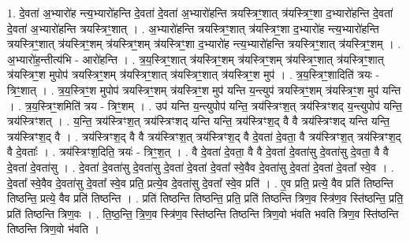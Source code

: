 \documentclass[17pt]{extarticle}
\begin{document}
1. दे॒वता॑ अ॒भ्यारो॑ह न्त्य॒भ्यारो॑हन्ति दे॒वता॑ दे॒वता॑ अ॒भ्यारो॑हन्ति त्रयस्त्रिꣳ॒॒शात् त्र॑यस्त्रिꣳ॒॒शा द॒भ्यारो॑हन्ति दे॒वता॑ दे॒वता॑ अ॒भ्यारो॑हन्ति त्रयस्त्रिꣳ॒॒शात् । . अ॒भ्यारो॑हन्ति त्रयस्त्रिꣳ॒॒शात् त्र॑यस्त्रिꣳ॒॒शा द॒भ्यारो॑ह न्त्य॒भ्यारो॑हन्ति त्रयस्त्रिꣳ॒॒शात् त्र॑यस्त्रिꣳ॒॒शम् त्र॑यस्त्रिꣳ॒॒शम् त्र॑यस्त्रिꣳ॒॒शा द॒भ्यारो॑ह न्त्य॒भ्यारो॑हन्ति त्रयस्त्रिꣳ॒॒शात् त्र॑यस्त्रिꣳ॒॒शम् । . अ॒भ्यारो॑ह॒न्तीत्य॑भि - आरो॑हन्ति । . त्र॒य॒स्त्रिꣳ॒॒शात् त्र॑यस्त्रिꣳ॒॒शम् त्र॑यस्त्रिꣳ॒॒शम् त्र॑यस्त्रिꣳ॒॒शात् त्र॑यस्त्रिꣳ॒॒शात् त्र॑यस्त्रिꣳ॒॒श मुपोप॑ त्रयस्त्रिꣳ॒॒शम् त्र॑यस्त्रिꣳ॒॒शात् त्र॑यस्त्रिꣳ॒॒शात् त्र॑यस्त्रिꣳ॒॒श मुप॑ । . त्र॒य॒स्त्रिꣳ॒॒शादिति॑ त्रयः - त्रिꣳ॒॒शात् । . त्र॒य॒स्त्रिꣳ॒॒श मुपोप॑ त्रयस्त्रिꣳ॒॒शम् त्र॑यस्त्रिꣳ॒॒श मुप॑ यन्ति य॒न्त्युप॑ त्रयस्त्रिꣳ॒॒शम् त्र॑यस्त्रिꣳ॒॒श मुप॑ यन्ति । . त्र॒य॒स्त्रिꣳ॒॒शमिति॑ त्रय - त्रिꣳ॒॒शम् । . उप॑ यन्ति य॒न्त्युपोप॑ यन्ति॒ त्रय॑स्त्रिꣳश॒त् त्रय॑स्त्रिꣳशद् य॒न्त्युपोप॑ यन्ति॒ त्रय॑स्त्रिꣳशत् । . य॒न्ति॒ त्रय॑स्त्रिꣳश॒त् त्रय॑स्त्रिꣳशद् यन्ति यन्ति॒ त्रय॑स्त्रिꣳश॒द् वै वै त्रय॑स्त्रिꣳशद् यन्ति यन्ति॒ त्रय॑स्त्रिꣳश॒द् वै । . त्रय॑स्त्रिꣳश॒द् वै वै त्रय॑स्त्रिꣳश॒त् त्रय॑स्त्रिꣳश॒द् वै दे॒वता॑ दे॒वता॒ वै त्रय॑स्त्रिꣳश॒त् त्रय॑स्त्रिꣳश॒द् वै दे॒वताः᳚ । . त्रय॑स्त्रिꣳश॒दिति॒ त्रयः॑ - त्रिꣳ॒॒श॒त् । . वै दे॒वता॑ दे॒वता॒ वै वै दे॒वता॑ दे॒वता॑सु दे॒वता॑सु दे॒वता॒ वै वै दे॒वता॑ दे॒वता॑सु । . दे॒वता॑ दे॒वता॑सु दे॒वता॑सु दे॒वता॑ दे॒वता॑ दे॒वता᳚ स्वे॒वैव दे॒वता॑सु दे॒वता॑ दे॒वता॑ दे॒वता᳚ स्वे॒व । . दे॒वता᳚ स्वे॒वैव दे॒वता॑सु दे॒वता᳚ स्वे॒व प्रति॒ प्रत्ये॒व दे॒वता॑सु दे॒वता᳚ स्वे॒व प्रति॑ । . ए॒व प्रति॒ प्रत्ये॒ वैव प्रति॑ तिष्ठन्ति तिष्ठन्ति॒ प्रत्ये॒ वैव प्रति॑ तिष्ठन्ति । . प्रति॑ तिष्ठन्ति तिष्ठन्ति॒ प्रति॒ प्रति॑ तिष्ठन्ति त्रिण॒व स्त्रि॑ण॒व स्ति॑ष्ठन्ति॒ प्रति॒ प्रति॑ तिष्ठन्ति त्रिण॒वः । . ति॒ष्ठ॒न्ति॒ त्रि॒ण॒व स्त्रि॑ण॒व स्ति॑ष्ठन्ति तिष्ठन्ति त्रिण॒वो भ॑वति भवति त्रिण॒व स्ति॑ष्ठन्ति तिष्ठन्ति त्रिण॒वो भ॑वति । \newline
\end{document}
